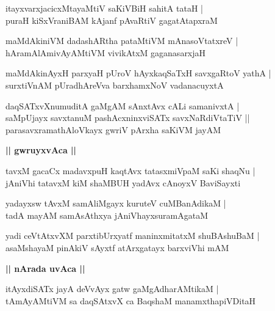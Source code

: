 \documentclass[twoside,12pt,openright]{book}
\newcounter{shloka}[chapter]
\def\uvaca#1{\centerline{{\large\textbf{#1}}}}
\begin{document}
\begin{shloka}%
itayxvarxjacicxMtayaMtiV saKiVBiH sahitA tataH |\\
puraH kiSxVraniBAM kAjanf pAvaRtiV gagatAtapxraM 
\end{shloka}

\begin{shloka}%
maMdAkiniVM dadashARtha pataMtiVM mAnasoVtatxreV |\\
hAramAlAmivAyAMtiVM vivikAtxM gaganasarxjaH 
\end{shloka}

\begin{shloka}%
maMdAkinAyxH parxyaH pUroV hAyxkaqSaTxH savxgaRtoV yathA |\\
surxtiVnAM pUradhAreVva barxhamxNoV vadanacuyxtA 
\end{shloka}

\begin{shloka}%
daqSATxvXnumuditA gaMgAM sAnxtAvx cALi samanivxtA |\\
saMpUjayx savxtanuM pashAcxninxviSATx savxNaRdiVtaTiV ||\\
parasavxramathAloVkayx gwriV pArxha saKiVM jayAM 
\end{shloka}

\uvaca{|| gwruyxvAca ||}

\begin{shloka}%
tavxM gacaCx madavxpuH kaqtAvx tatasxmiVpaM saKi shaqNu |\\
jAniVhi tatavxM kiM shaMBUH yadAvx cAnoyxV BaviSayxti
\end{shloka}

\begin{shloka}%
yadayxsw tAvxM samAliMgayx kuruteV cuMBanAdikaM  |\\
tadA mayAM samAsAthxya jAniVhayxsuramAgataM 
\end{shloka}

\begin{shloka}%
yadi ceVtAtxvXM parxtibUrxyatf maninxmitatxM shuBAshuBaM |\\
asaMshayaM pinAkiV sAyxtf atArxgatayx barxviVhi mAM 
\end{shloka}

\uvaca{|| nArada uvAca ||}

\begin{shloka}%
itAyxdiSATx jayA deVvAyx gatw gaMgAdharAMtikaM |\\
tAmAyAMtiVM sa daqSAtxvX ca BaqshaM manamxthapiVDitaH 
\end{shloka}
\end{document}
